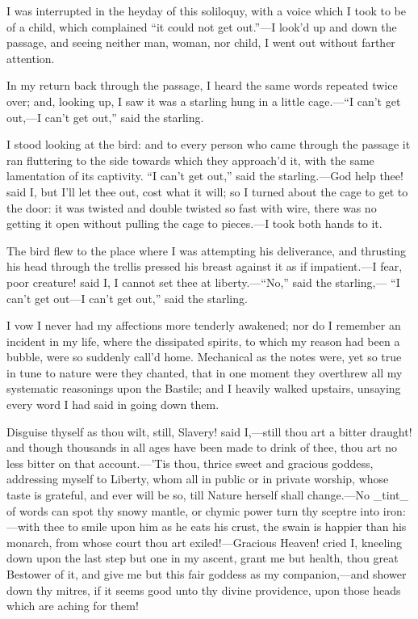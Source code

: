 \documentclass[twoside]{article}
\begin{document}
I was interrupted in the heyday of this soliloquy, with a voice which I
took to be of a child, which complained “it could not get out.”—I look’d
up and down the passage, and seeing neither man, woman, nor child, I went
out without farther attention.

In my return back through the passage, I heard the same words repeated
twice over; and, looking up, I saw it was a starling hung in a little
cage.—“I can’t get out,—I can’t get out,” said the starling.

I stood looking at the bird: and to every person who came through the
passage it ran fluttering to the side towards which they approach’d it,
with the same lamentation of its captivity.  “I can’t get out,” said the
starling.—God help thee! said I, but I’ll let thee out, cost what it
will; so I turned about the cage to get to the door: it was twisted and
double twisted so fast with wire, there was no getting it open without
pulling the cage to pieces.—I took both hands to it.

The bird flew to the place where I was attempting his deliverance, and
thrusting his head through the trellis pressed his breast against it as
if impatient.—I fear, poor creature! said I, I cannot set thee at
liberty.—“No,” said the starling,— “I can’t get out—I can’t get out,”
said the starling.

I vow I never had my affections more tenderly awakened; nor do I remember
an incident in my life, where the dissipated spirits, to which my reason
had been a bubble, were so suddenly call’d home.  Mechanical as the notes
were, yet so true in tune to nature were they chanted, that in one moment
they overthrew all my systematic reasonings upon the Bastile; and I
heavily walked upstairs, unsaying every word I had said in going down
them.

Disguise thyself as thou wilt, still, Slavery! said I,—still thou art a
bitter draught! and though thousands in all ages have been made to drink
of thee, thou art no less bitter on that account.—’Tis thou, thrice sweet
and gracious goddess, addressing myself to Liberty, whom all in public or
in private worship, whose taste is grateful, and ever will be so, till
Nature herself shall change.—No _tint_ of words can spot thy snowy
mantle, or chymic power turn thy sceptre into iron:—with thee to smile
upon him as he eats his crust, the swain is happier than his monarch,
from whose court thou art exiled!—Gracious Heaven! cried I, kneeling down
upon the last step but one in my ascent, grant me but health, thou great
Bestower of it, and give me but this fair goddess as my companion,—and
shower down thy mitres, if it seems good unto thy divine providence, upon
those heads which are aching for them!
\end{document}

